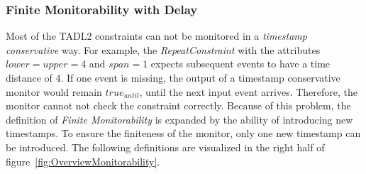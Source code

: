 	\subsubsection{Finite Monitorability with Delay}
		Most of the TADL2 constraints can not be monitored in a \emph{timestamp conservative} way. For example, the \emph{RepeatConstraint} with the attributes $lower=upper=4$ and $span=1$ expects subsequent events to have a time distance of $4$. If one event is missing, the output of a timestamp conservative monitor would remain $true_{until}$, until the next input event arrives. Therefore, the monitor cannot not check the constraint correctly. Because of this problem, the definition of \emph{Finite Monitorability} is expanded by the ability of introducing new timestamps. To ensure the finiteness of the monitor, only one new timestamp can be introduced. The following definitions are visualized in the right half of figure~\ref{fig:OverviewMonitorability}.
